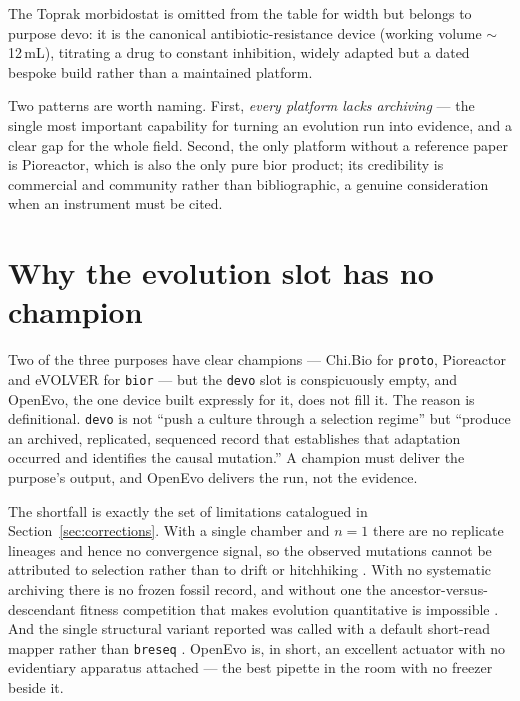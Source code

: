 \documentclass[11pt,a4paper]{article}
\newcommand{\code}[1]{\texttt{\small #1}}
\begin{document}
The Toprak morbidostat \cite{toprak2013morbidostat} is omitted from the table for width but
belongs to purpose devo: it is the canonical antibiotic-resistance device (working volume
$\sim$12\,mL), titrating a drug to constant inhibition, widely adapted but a dated bespoke
build rather than a maintained platform.

Two patterns are worth naming. First, \emph{every platform lacks archiving} --- the single
most important capability for turning an evolution run into evidence, and a clear gap for the
whole field. Second, the only platform without a reference paper is Pioreactor, which is also
the only pure bior product; its credibility is commercial and community rather than
bibliographic, a genuine consideration when an instrument must be cited.

\section{Why the evolution slot has no champion}
\label{sec:devo}

Two of the three purposes have clear champions --- Chi.Bio for \texttt{proto}, Pioreactor and
eVOLVER for \texttt{bior} --- but the \texttt{devo} slot is conspicuously empty, and OpenEvo,
the one device built expressly for it, does not fill it. The reason is definitional.
\texttt{devo} is not ``push a culture through a selection regime'' but ``produce an archived,
replicated, sequenced record that establishes that adaptation occurred and identifies the
causal mutation.'' A champion must deliver the purpose's output, and OpenEvo delivers the run,
not the evidence.

The shortfall is exactly the set of limitations catalogued in Section~\ref{sec:corrections}.
With a single chamber and $n=1$ there are no replicate lineages and hence no convergence signal,
so the observed mutations cannot be attributed to selection rather than to drift or hitchhiking
\cite{blount2012cit}. With no systematic archiving there is no frozen fossil record, and without
one the ancestor-versus-descendant fitness competition that makes evolution quantitative is
impossible \cite{barrick2023ltee}. And the single structural variant reported was called with a
default short-read mapper rather than \code{breseq} \cite{deatherage2014breseq}. OpenEvo is, in
short, an excellent actuator with no evidentiary apparatus attached --- the best pipette in the
room with no freezer beside it.
\end{document}
